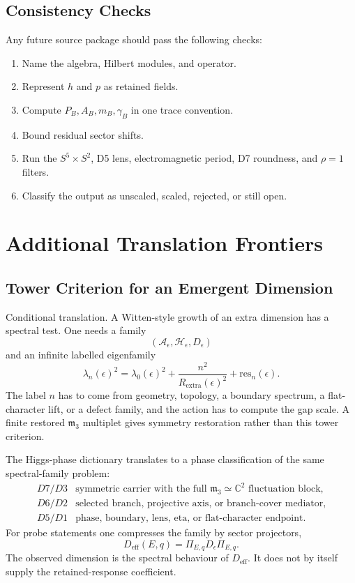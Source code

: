 \documentclass[11pt]{article}
\newcommand{\CC}{\mathbb{C}}
\newcommand{\mthree}{\mathfrak m_3}
\begin{document}
\subsection{Consistency Checks}

Any future source package should pass the following checks:
\begin{enumerate}[leftmargin=2em]
  \item Name the algebra, Hilbert modules, and operator.
  \item Represent \(h\) and \(p\) as retained fields.
  \item Compute \(P_B,A_B,m_B,\gamma_B\) in one trace convention.
  \item Bound residual sector shifts.
  \item Run the \(S^5\times S^2\), D5 lens, electromagnetic period, D7
  roundness, and \(\rho=1\) filters.
  \item Classify the output as unscaled, scaled, rejected, or still open.
\end{enumerate}

\section{Additional Translation Frontiers}

\subsection{Tower Criterion for an Emergent Dimension}

Conditional translation.  A Witten-style growth of an extra dimension has a
spectral test.  One needs a family
\[
  (\mathcal A_\epsilon,\mathcal H_\epsilon,D_\epsilon)
\]
and an infinite labelled eigenfamily
\[
  \lambda_n(\epsilon)^2
  =\lambda_0(\epsilon)^2+\frac{n^2}{R_{\mathrm{extra}}(\epsilon)^2}
    +\mathrm{res}_n(\epsilon).
\]
The label \(n\) has to come from geometry, topology, a boundary spectrum, a
flat-character lift, or a defect family, and the action has to compute the
gap scale.  A finite restored \(\mthree\) multiplet gives symmetry
restoration rather than this tower criterion.

The Higgs-phase dictionary translates to a phase classification of the same
spectral-family problem:
\[
\begin{array}{ll}
D7/D3 & \text{symmetric carrier with the full }\mthree\simeq\CC^2
         \text{ fluctuation block},\\
D6/D2 & \text{selected branch, projective axis, or branch-cover mediator},\\
D5/D1 & \text{phase, boundary, lens, eta, or flat-character endpoint}.
\end{array}
\]
For probe statements one compresses the family by sector projectors,
\[
  D_{\mathrm{eff}}(E,q)
    =\Pi_{E,q}D_\epsilon\Pi_{E,q}.
\]
The observed dimension is the spectral behaviour of \(D_{\mathrm{eff}}\).
It does not by itself supply the retained-response coefficient.
\end{document}
